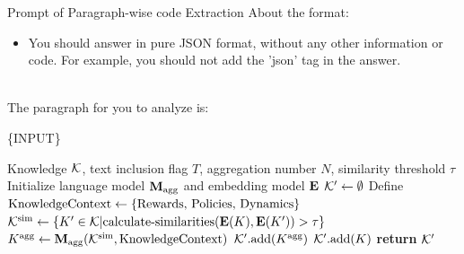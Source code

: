 \begin{gbox}{Prompt of Paragraph-wise code Extraction}
About the format:
\begin{itemize}
    \item You should answer in pure JSON format, without any other information or code. For example, you should not add the 'json' tag in the answer.
\end{itemize}
~\\

The paragraph for you to analyze is: 

\hspace{10mm}  \{INPUT\}

\end{gbox}

\begin{algorithm}
\caption{Code-based Knowledge Aggregation (one round)}
\label{alg:code_info_aggregation}
\begin{algorithmic}[1]
\Require Knowledge $\mathcal{K}$, text inclusion flag $T$, aggregation number $N$, similarity threshold $\tau$
\State Initialize language model $\mathbf{M}_{\rm agg}$ and embedding model $\mathbf{E}$
\State $\mathcal{K}^\prime \gets \emptyset$
 
    \State Define ${\rm Knowledge Context} \gets \{\text{Rewards, Policies, Dynamics}\}$
    \State $\mathcal{K}^{\rm sim} \gets \{K' \in \mathcal{K} | \text{calculate-similarities}(\mathbf{E}(K), \mathbf{E}(K')) > \tau\}$
        \State $K^{\rm agg} \gets \mathbf{M}_{\rm agg}(\mathcal{K}^{\rm sim},{\rm Knowledge Context})$
        \State $\mathcal{K}^\prime.\text{add}(K^{\rm agg})$
    \Else
        \State $\mathcal{K}^\prime.\text{add}(K)$
    \EndIf
\EndFor
\State \textbf{return} $\mathcal{K}^\prime$
\end{algorithmic}
\end{algorithm}



